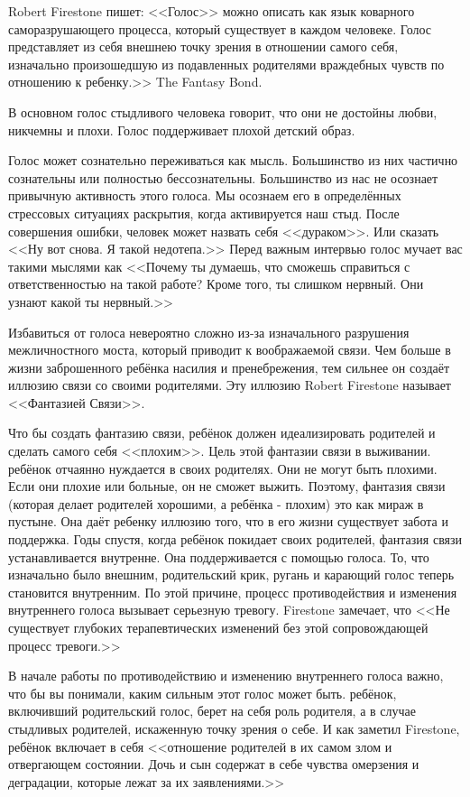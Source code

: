 \documentclass[10pt, fleqn]{article}
\begin{document}
Robert Firestone пишет:
<<Голос>> можно описать как язык коварного саморазрушающего процесса, который существует в каждом человеке. Голос представляет из себя внешнею точку зрения в отношении самого себя, изначально произошедшую из подавленных родителями враждебных чувств по отношению к ребенку.>> The Fantasy Bond.

В основном голос стыдливого человека говорит, что они не достойны любви, никчемны и плохи. Голос поддерживает плохой детский образ.

Голос может сознательно переживаться как мысль. Большинство из них частично сознательны или полностью бессознательны. Большинство из нас не осознает привычную активность этого голоса. Мы осознаем его в определённых стрессовых ситуациях раскрытия, когда активируется наш стыд. После совершения ошибки, человек может назвать себя <<дураком>>. Или сказать <<Ну вот снова. Я такой недотепа.>> Перед важным интервью голос мучает вас такими мыслями как <<Почему ты думаешь, что сможешь справиться с ответственностью на такой работе? Кроме того, ты слишком нервный. Они узнают какой ты нервный.>>

Избавиться от голоса невероятно сложно из-за изначального разрушения межличностного моста, который приводит к воображаемой связи. Чем больше в жизни заброшенного ребёнка насилия и пренебрежения, тем сильнее он создаёт иллюзию связи со своими родителями. Эту иллюзию Robert Firestone называет <<Фантазией Связи>>.

Что бы создать фантазию связи, ребёнок должен идеализировать родителей и сделать самого себя <<плохим>>. Цель этой фантазии связи в выживании. ребёнок отчаянно нуждается в своих родителях. Они не могут быть плохими. Если они плохие или больные, он не сможет выжить. Поэтому, фантазия связи (которая делает родителей хорошими, а ребёнка - плохим) это как мираж в пустыне. Она даёт ребенку иллюзию того, что в его жизни существует забота и поддержка. Годы спустя, когда ребёнок покидает своих родителей, фантазия связи устанавливается внутренне. Она поддерживается с помощью голоса. То, что изначально было внешним, родительский крик, ругань и карающий голос теперь становится внутренним. По этой причине, процесс противодействия и изменения внутреннего голоса вызывает серьезную тревогу. Firestone замечает, что <<Не существует глубоких терапевтических изменений без этой сопровождающей процесс тревоги.>>


В начале работы по противодействию и изменению внутреннего голоса важно, что бы вы понимали, каким сильным этот голос может быть. ребёнок, включивший родительский голос, берет на себя роль родителя, а в случае стыдливых родителей, искаженную точку зрения о себе. И как заметил Firestone, ребёнок включает в себя <<отношение родителей в их самом злом и отвергающем состоянии. Дочь и сын содержат в себе чувства омерзения и деградации, которые лежат за их заявлениями.>>
\end{document}
